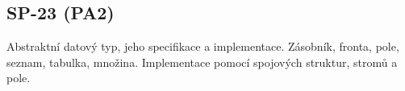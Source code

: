 \subsection{SP-23 (PA2)}
Abstraktní datový typ, jeho specifikace a implementace. Zásobník, fronta, pole, seznam, tabulka, množina. Implementace pomocí spojových struktur, stromů a pole.